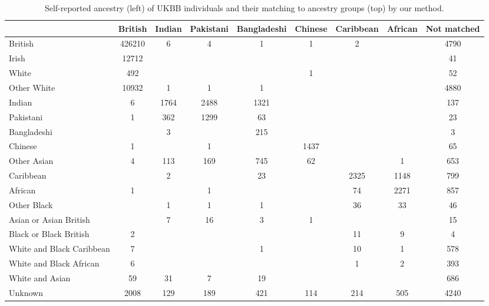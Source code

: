 \begin{table}[ht]
\centering
\caption{Self-reported ancestry (left) of UKBB individuals and their matching to ancestry groups (top) by our method.} 
\label{tab:ancestry-groups}
\begin{tabular}{|l|c|c|c|c|c|c|c|c|}
  \hline
 & British & Indian & Pakistani & Bangladeshi & Chinese & Caribbean & African & Not matched \\ 
  \hline
British & 426210 & 6 & 4 & 1 & 1 & 2 &  & 4790 \\ 
  Irish & 12712 &  &  &  &  &  &  & 41 \\ 
  White & 492 &  &  &  & 1 &  &  & 52 \\ 
  Other White & 10932 & 1 & 1 & 1 &  &  &  & 4880 \\ 
   \hline
Indian & 6 & 1764 & 2488 & 1321 &  &  &  & 137 \\ 
  Pakistani & 1 & 362 & 1299 & 63 &  &  &  & 23 \\ 
  Bangladeshi &  & 3 &  & 215 &  &  &  & 3 \\ 
  Chinese & 1 &  & 1 &  & 1437 &  &  & 65 \\ 
  Other Asian & 4 & 113 & 169 & 745 & 62 &  & 1 & 653 \\ 
   \hline
Caribbean &  & 2 &  & 23 &  & 2325 & 1148 & 799 \\ 
  African & 1 &  & 1 &  &  & 74 & 2271 & 857 \\ 
  Other Black &  & 1 & 1 & 1 &  & 36 & 33 & 46 \\ 
   \hline
Asian or Asian British &  & 7 & 16 & 3 & 1 &  &  & 15 \\ 
  Black or Black British & 2 &  &  &  &  & 11 & 9 & 4 \\ 
  White and Black Caribbean & 7 &  &  & 1 &  & 10 & 1 & 578 \\ 
  White and Black African & 6 &  &  &  &  & 1 & 2 & 393 \\ 
  White and Asian & 59 & 31 & 7 & 19 &  &  &  & 686 \\ 
   \hline
Unknown  & 2008 & 129 & 189 & 421 & 114 & 214 & 505 & 4240 \\ 
   \hline
\end{tabular}
\end{table}
